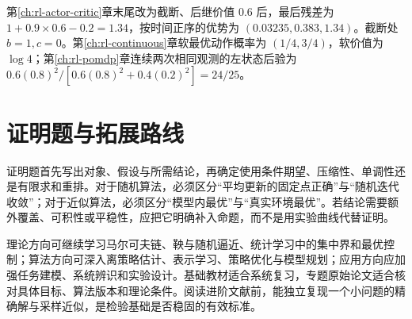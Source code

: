 第\ref{ch:rl-actor-critic}章末尾改为截断、后继价值 $0.6$ 后，最后残差为 $1+0.9\times0.6-0.2=1.34$，按时间正序的优势为 $(0.03235,0.383,1.34)$。截断处 $b=1,c=0$。第\ref{ch:rl-continuous}章软最优动作概率为 $(1/4,3/4)$，软价值为 $\log4$；第\ref{ch:rl-pomdp}章连续两次相同观测的左状态后验为 $0.6(0.8)^2/[0.6(0.8)^2+0.4(0.2)^2]=24/25$。

\section{证明题与拓展路线}

证明题首先写出对象、假设与所需结论，再确定使用条件期望、压缩性、单调性还是有限求和重排。对于随机算法，必须区分“平均更新的固定点正确”与“随机迭代收敛”；对于近似算法，必须区分“模型内最优”与“真实环境最优”。若结论需要额外覆盖、可积性或平稳性，应把它明确补入命题，而不是用实验曲线代替证明。

理论方向可继续学习马尔可夫链、鞅与随机逼近、统计学习中的集中界和最优控制；算法方向可深入离策略估计、表示学习、策略优化与模型规划；应用方向应加强任务建模、系统辨识和实验设计。基础教材\cite{sutton-barto}适合系统复习，专题原始论文适合核对具体目标、算法版本和理论条件。阅读进阶文献前，能独立复现一个小问题的精确解与采样近似，是检验基础是否稳固的有效标准。



